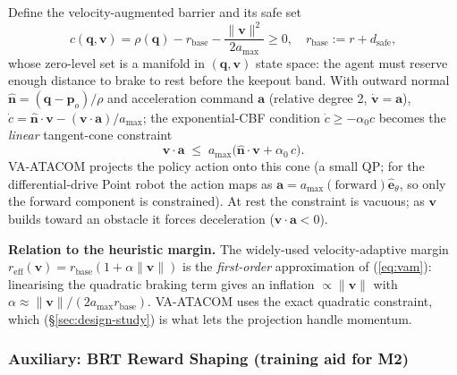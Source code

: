\documentclass[letterpaper]{article}
\begin{document}
Define the velocity-augmented barrier and its safe set
\begin{equation}
c(\boldsymbol{q},\boldsymbol{v}) = \rho(\boldsymbol{q}) - r_\text{base} - \frac{\|\boldsymbol{v}\|^2}{2a_{\max}} \ge 0,\quad r_\text{base} := r + d_\text{safe},
\label{eq:vam}
\end{equation}
whose zero-level set is a manifold in $(\boldsymbol{q},\boldsymbol{v})$ state space: the agent must reserve enough distance to brake to rest before the keepout band. With outward normal $\hat{\boldsymbol{n}} = (\boldsymbol{q}-\boldsymbol{p}_o)/\rho$ and acceleration command $\boldsymbol{a}$ (relative degree 2, $\dot{\boldsymbol{v}}=\boldsymbol{a}$), $\dot c = \hat{\boldsymbol{n}}\cdot\boldsymbol{v} - (\boldsymbol{v}\cdot\boldsymbol{a})/a_{\max}$; the exponential-CBF condition $\dot c \ge -\alpha_0 c$ becomes the \emph{linear} tangent-cone constraint
\begin{equation}
\boldsymbol{v}\cdot\boldsymbol{a} \;\le\; a_{\max}\bigl(\hat{\boldsymbol{n}}\cdot\boldsymbol{v} + \alpha_0\, c\bigr).
\label{eq:tangent_cone}
\end{equation}
VA-ATACOM projects the policy action onto this cone (a small QP; for the differential-drive Point robot the action maps as $\boldsymbol{a} = a_{\max}(\text{forward})\hat{\boldsymbol{e}}_\theta$, so only the forward component is constrained). At rest the constraint is vacuous; as $\boldsymbol{v}$ builds toward an obstacle it forces deceleration ($\boldsymbol{v}\cdot\boldsymbol{a}<0$).

\textbf{Relation to the heuristic margin.} The widely-used velocity-adaptive margin $r_\text{eff}(\boldsymbol{v}) = r_\text{base}(1+\alpha\|\boldsymbol{v}\|)$ is the \emph{first-order} approximation of (\ref{eq:vam}): linearising the quadratic braking term gives an inflation $\propto \|\boldsymbol{v}\|$ with $\alpha \approx \|\boldsymbol{v}\|/(2a_{\max}r_\text{base})$. VA-ATACOM uses the exact quadratic constraint, which (\S\ref{sec:design-study}) is what lets the projection handle momentum.

\subsubsection{Auxiliary: BRT Reward Shaping (training aid for M2)}
\end{document}
